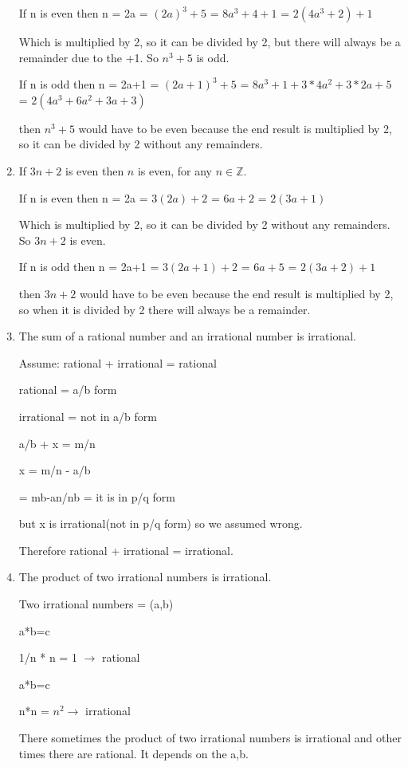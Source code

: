 \documentclass[11pt]{article}
\begin{document}
\begin{enumerate}
If n is even then n = 2a = $(2a)^3+5$ = $8a^3+4+1$ = $2(4a^3+2)+1$

Which is multiplied by 2, so it can be divided by 2, but there will always be a remainder due to the +1. So $n^3+5$ is odd.

If n is odd then n = 2a+1 = $(2a+1)^3+5$ = $8a^3+1+3*4a^2+3*2a+5$ = $2(4a^3+6a^2+3a+3)$

then $n^3+5$ would have to be even because the end result is multiplied by 2, so it can be divided by 2 without any remainders.

\item
If $3n+2$ is even then $n$ is even, for any $n \in \mathbb{Z}$.

If n is even then n = 2a = $3(2a)+2$ = $6a+2$ = $2(3a+1)$

Which is multiplied by 2, so it can be divided by 2 without any remainders. So $3n+2$ is even.

If n is odd then n = 2a+1 = $3(2a+1)+2$ = $6a+5$ = $2(3a+2)+1$

then $3n+2$ would have to be even because the end result is multiplied by 2, so when it is divided by 2 there will always be a remainder.

\item
 The sum of a rational number and an irrational number is irrational.
 
 Assume: rational + irrational = rational
 
 rational = a/b form
 
 irrational = not in a/b form
 
 a/b + x = m/n
 
 x = m/n - a/b
 
 = mb-an/nb = it is in p/q form
 
 but x is irrational(not in p/q form) so we assumed wrong.
 
 Therefore rational + irrational = irrational.
 
 \item
 The product of two irrational numbers is irrational.
 
 Two irrational numbers = (a,b)
 
 a*b=c
 
 1/n * n = 1 $\rightarrow$ rational
 
 a*b=c
 
 n*n = $n^2 \rightarrow$ irrational
 
 There sometimes the product of two irrational numbers is irrational and other times there are rational. It depends on the a,b.
 

\end{enumerate}
\end{document}
